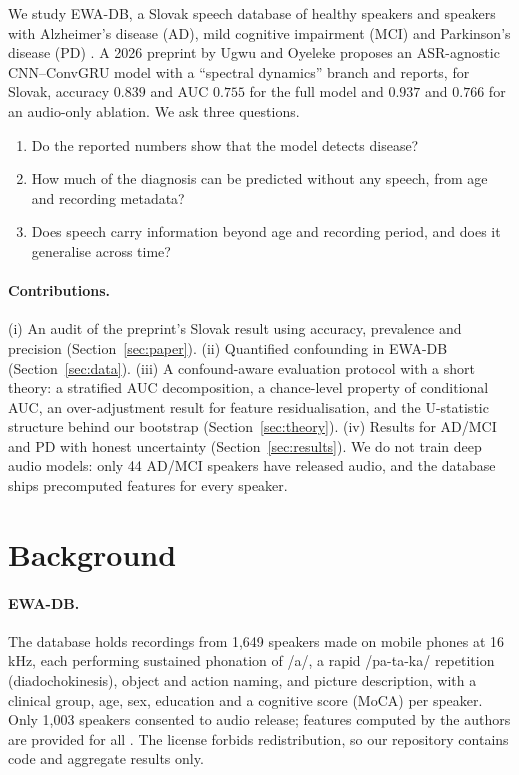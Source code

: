 \documentclass[10pt]{article}
\begin{document}
We study EWA-DB, a Slovak speech database of healthy speakers and speakers with Alzheimer's disease (AD), mild cognitive impairment (MCI) and Parkinson's disease (PD) \cite{rusko2024}. A 2026 preprint by Ugwu and Oyeleke \cite{ugwu2026} proposes an ASR-agnostic CNN--ConvGRU model with a ``spectral dynamics'' branch and reports, for Slovak, accuracy $0.839$ and AUC $0.755$ for the full model and $0.937$ and $0.766$ for an audio-only ablation. We ask three questions.
\begin{enumerate}
\item[\textbf{Q1.}] Do the reported numbers show that the model detects disease?
\item[\textbf{Q2.}] How much of the diagnosis can be predicted without any speech, from age and recording metadata?
\item[\textbf{Q3.}] Does speech carry information beyond age and recording period, and does it generalise across time?
\end{enumerate}
\paragraph{Contributions.} (i) An audit of the preprint's Slovak result using accuracy, prevalence and precision (Section~\ref{sec:paper}). (ii) Quantified confounding in EWA-DB (Section~\ref{sec:data}). (iii) A confound-aware evaluation protocol with a short theory: a stratified AUC decomposition, a chance-level property of conditional AUC, an over-adjustment result for feature residualisation, and the U-statistic structure behind our bootstrap (Section~\ref{sec:theory}). (iv) Results for AD/MCI and PD with honest uncertainty (Section~\ref{sec:results}). We do not train deep audio models: only 44 AD/MCI speakers have released audio, and the database ships precomputed features for every speaker.

\section{Background}
\paragraph{EWA-DB.} The database holds recordings from 1,649 speakers made on mobile phones at 16\,kHz, each performing sustained phonation of /a/, a rapid /pa-ta-ka/ repetition (diadochokinesis), object and action naming, and picture description, with a clinical group, age, sex, education and a cognitive score (MoCA) per speaker. Only 1,003 speakers consented to audio release; features computed by the authors are provided for all \cite{rusko2024}. The license forbids redistribution, so our repository contains code and aggregate results only.
\end{document}

